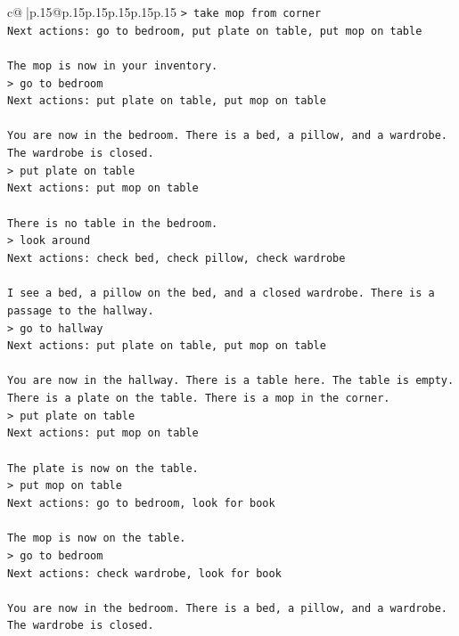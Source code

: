 \documentclass{article}
\begin{document}
{\begin{supertabular}{c@{$\;$}|p{.15\linewidth}@{}p{.15\linewidth}p{.15\linewidth}p{.15\linewidth}p{.15\linewidth}p{.15\linewidth}}
{{{\texttt{> take mop from corner  } \\
\texttt{Next actions: go to bedroom, put plate on table, put mop on table} \\
\\ 
\texttt{The mop is now in your inventory.  } \\
\texttt{> go to bedroom  } \\
\texttt{Next actions: put plate on table, put mop on table} \\
\\ 
\texttt{You are now in the bedroom. There is a bed, a pillow, and a wardrobe. The wardrobe is closed.  } \\
\texttt{> put plate on table  } \\
\texttt{Next actions: put mop on table} \\
\\ 
\texttt{There is no table in the bedroom.  } \\
\texttt{> look around  } \\
\texttt{Next actions: check bed, check pillow, check wardrobe} \\
\\ 
\texttt{I see a bed, a pillow on the bed, and a closed wardrobe. There is a passage to the hallway.  } \\
\texttt{> go to hallway  } \\
\texttt{Next actions: put plate on table, put mop on table} \\
\\ 
\texttt{You are now in the hallway. There is a table here. The table is empty. There is a plate on the table. There is a mop in the corner.  } \\
\texttt{> put plate on table  } \\
\texttt{Next actions: put mop on table} \\
\\ 
\texttt{The plate is now on the table.  } \\
\texttt{> put mop on table  } \\
\texttt{Next actions: go to bedroom, look for book} \\
\\ 
\texttt{The mop is now on the table.  } \\
\texttt{> go to bedroom  } \\
\texttt{Next actions: check wardrobe, look for book} \\
\\ 
\texttt{You are now in the bedroom. There is a bed, a pillow, and a wardrobe. The wardrobe is closed.  } \\
}}}
\end{supertabular}}
\end{document}
